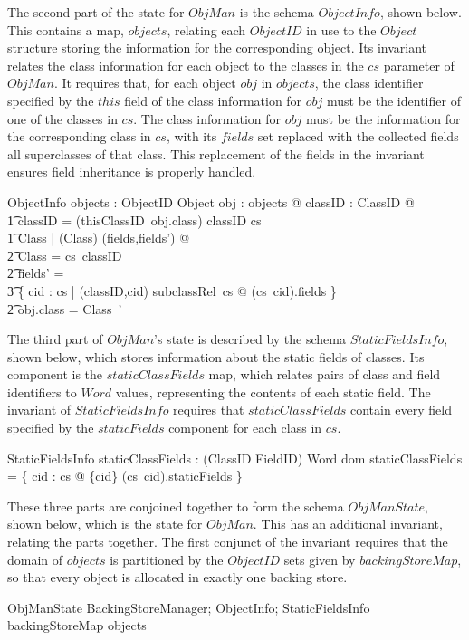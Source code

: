 The second part of the state for $ObjMan$ is the schema $ObjectInfo$,
shown below.
This contains a map, $objects$, relating each $ObjectID$ in use to the
$Object$ structure storing the information for the corresponding
object.
Its invariant relates the class information for each object to the
classes in the $cs$ parameter of $ObjMan$.
It requires that, for each object $obj$ in $objects$, the class
identifier specified by the $this$ field of the class information for
$obj$ must be the identifier of one of the classes in $cs$.
The class information for $obj$ must be the information for the
corresponding class in $cs$, with its $fields$ set replaced with the
collected fields all superclasses of that class.
This replacement of the fields in the invariant ensures field
inheritance is properly handled.
\begin{schema}{ObjectInfo}
	objects : ObjectID \pfun Object
\where
	\forall obj : \ran objects @ \exists classID : ClassID @ \\
	\t1 classID = (thisClassID~obj.class) \land classID \in \dom cs \land \\
	\t1 \exists \Delta Class | (\Xi Class) \hide (fields,fields') @ \\
	\t2 \theta Class = cs~classID \land \\
	\t2 fields' = {} \\
	\t3 \bigcup \{ cid : \dom cs | (classID,cid) \in subclassRel~cs @ (cs~cid).fields \} \land \\
	\t2 obj.class = \theta Class~'
\end{schema}
      
The third part of $ObjMan$'s state is described by the schema
$StaticFieldsInfo$, shown below, which stores information about the
static fields of classes.
Its component is the $staticClassFields$ map, which relates pairs of
class and field identifiers to $Word$ values, representing the
contents of each static field.
The invariant of $StaticFieldsInfo$ requires that $staticClassFields$
contain every field specified by the $staticFields$ component for each
class in $cs$.
\begin{schema}{StaticFieldsInfo}
	staticClassFields : (ClassID \cross FieldID) \pfun Word
\where
	dom staticClassFields = \bigcup \{ cid : \dom cs @ \{cid\} \cross (cs~cid).staticFields \}
\end{schema}

These three parts are conjoined together to form the schema
$ObjManState$, shown below, which is the state for $ObjMan$.
This has an additional invariant, relating the parts together.
The first conjunct of the invariant requires that the domain of
$objects$ is partitioned by the $ObjectID$ sets given by
$backingStoreMap$, so that every object is allocated in exactly one
backing store.
\begin{schema}{ObjManState}
	BackingStoreManager; ObjectInfo; StaticFieldsInfo
\where
	backingStoreMap \partition \dom objects \\
\end{schema}

